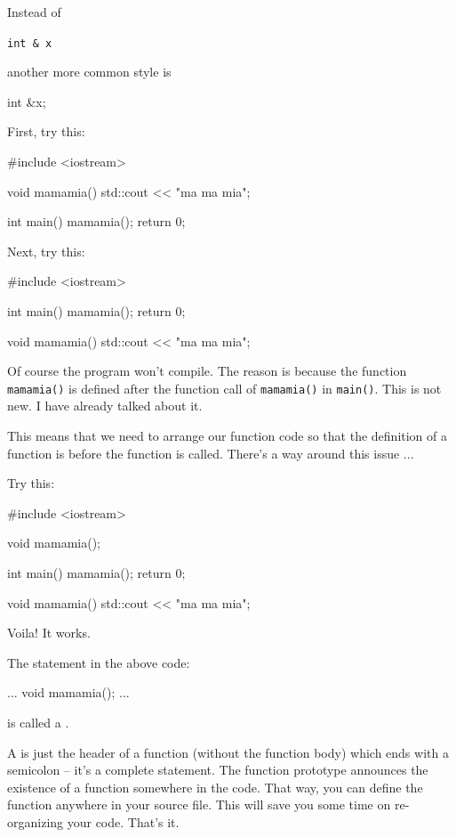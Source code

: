 Instead of

\texttt{int \& x}

another more common style is

int \&x;


\newpage{}

First, try this:

\begin{consolethree}[escapeinside=||]
#include <iostream>

void mamamia()
{
    std::cout << "ma ma mia\n";
}

int main()
{
    mamamia();
    return 0;
}
\end{consolethree}

Next, try this:

\begin{consolethree}[escapeinside=||]
#include <iostream>

int main()
{
    mamamia();
    return 0;
}

void mamamia()
{
    std::cout << "ma ma mia\n";
}
\end{consolethree}

Of course the program won't compile. The reason is because the function \texttt{mamamia()} is defined after the function call of \texttt{mamamia()} in \texttt{main()}. This is not new. I have already talked about it.

This means that we need to arrange our function code so that the definition of a function is before the function is called. There's a way around this issue ...

Try this:

\begin{consolethree}[escapeinside=||]
#include <iostream>

void mamamia();

int main()
{
    mamamia();
    return 0;
}

void mamamia()
{
    std::cout << "ma ma mia\n";
}
\end{consolethree}

Voila! It works.

The statement in the above code:

\begin{consolethree}[escapeinside=||]
...
void mamamia();
...
\end{consolethree}

is called a .

A  is just the header of a function (without the function body) which ends with a semicolon -- it's a complete statement. The function prototype announces the existence of a function somewhere in the code. That way, you can define the function anywhere in your source file. This will save you some time on re-organizing your code. That's it.


